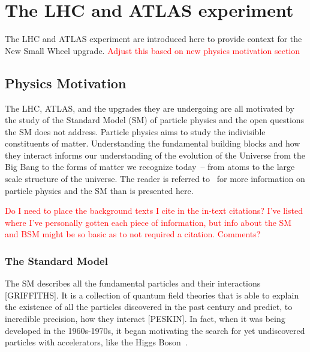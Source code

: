 
\chapter{The LHC and ATLAS experiment}
\label{chap:lhc_atlas}

The LHC and ATLAS experiment are introduced here to provide context for the New Small Wheel upgrade. \textcolor{red}{Adjust this based on new physics motivation section}

\section{Physics Motivation}

The LHC, ATLAS, and the upgrades they are undergoing are all motivated by the study of the Standard Model (SM) of particle physics and the open questions the SM does not address. Particle physics aims to study the indivisible constituents of matter. Understanding the fundamental building blocks and how they interact informs our understanding of the evolution of the Universe from the Big Bang to the forms of matter we recognize today~-- from atoms to the large scale structure of the universe. The reader is referred to~\cite{griffiths_introduction_2011, peskin_introduction_1995, zyla_review_2020} for more information on particle physics and the SM than is presented here.

\textcolor{red}{Do I need to place the background texts I cite in the in-text citations? I've listed where I've personally gotten each piece of information, but info about the SM and BSM might be so basic as to not required a citation. Comments?}

\subsection{The Standard Model}

The SM describes all the fundamental particles and their interactions [GRIFFITHS]. It is a collection of quantum field theories that is able to explain the existence of all the particles discovered in the past century and predict, to incredible precision, how they interact [PESKIN]. In fact, when it was being developed in the 1960s-1970s, it began motivating the search for yet undiscovered particles with accelerators, like the Higgs Boson~\cite{brianti_large_1984}. 

